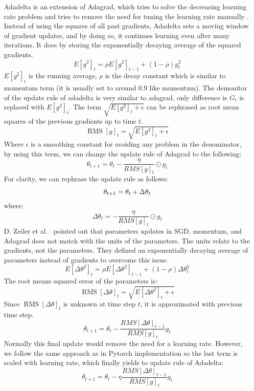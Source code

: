 \documentclass[a4paper, nobind]{templates/ociamthesis}
\begin{document}
\noindent Adadelta is an extension of Adagrad, which tries to solve the decreasing learning rate problem and tries to remove the need for tuning the learning rate manually \cite{zeiler2012adadelta}. Instead of using the squares of all past gradients, Adadelta sets a moving window of gradient updates, and by doing so, it continues learning even after many iterations. It does by storing the exponentially decaying average of the squared gradients.
\[
E\left[g^{2}\right]_{t}=\rho E\left[g^{2}\right]_{t-1}+(1-\rho) g_{t}^{2}
\]
\(E\left[g^{2}\right]_{t}\) is the running average, \(\rho\) is the decay constant which is similar to momentum term (it is usually set to around \(0.9\) like momentum). The demonitor of the update rule of adadelta is very similar to adagrad, only difference is \(G_{t}\) is replaced with \(E\left[g^{2}\right]_{t}\). The term \(\sqrt{E\left[g^{2}\right]_{t}+\epsilon}\) can be rephrased as root mean squares of the previous gradients up to time \(t\).
\[
\operatorname{RMS}[g]_{t}=\sqrt{E\left[g^{2}\right]_{t}+\epsilon}
\]
Where \(\epsilon\) is a smoothing constant for avoiding any problem in the denominator, by using this term, we can change the update rule of Adagrad to the following:
\[
\theta_{t+1}=\theta_{t}-\frac{\eta}{R M S[g]_{t}} \odot g_{t}
\]
For clarity, we can rephrase the update rule as follows:
\[
\theta_{t+1} = \theta_{t} + \Delta \theta_{t} \\
\]
where;
\[\Delta \theta_{t} = -\frac{\eta}{R M S[g]_{t}} \odot g_{t}\]
D. Zeiler et al.~\cite{zeiler2012adadelta} pointed out that parameters updates in SGD, momentum, and Adagrad does not match with the units of the parameters. The units relate to the gradients, not the parameters. They defined an exponentially decaying average of parameters instead of gradients to overcome this issue.
\[
E\left[\Delta \theta^{2}\right]_{t}=\rho E\left[\Delta \theta^{2}\right]_{t-1}+(1-\rho) \Delta \theta_{t}^{2}
\]
The root means squared error of the parameters is:
\[
\operatorname{RMS}[\Delta \theta]_{t}=\sqrt{E\left[\Delta \theta^{2}\right]_{t}+\epsilon}
\]
Since \(\operatorname{RMS}[\Delta \theta]_{t}\) is unknown at time step \(t\), it is approximated with previous time step.
\[
\theta_{t+1}=\theta_{t} - \frac{R M S[\Delta \theta]_{t-1}}{R M S[g]_{t}} g_{t}
\]
Normally this final update would remove the need for a learning rate. However, we follow the same approach as in Pytorch implementation \cite{NEURIPS2019_9015} so the last term is scaled with learning rate, which finally yields to update rule of Adadelta:
\[
\theta_{t+1}=\theta_{t} - \eta \frac{R M S[\Delta \theta]_{t-1}}{R M S[g]_{t}} g_{t}
\]
\end{document}
